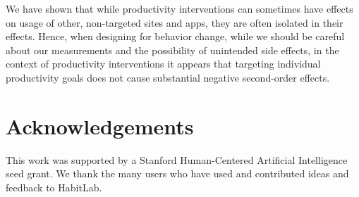 We have shown that while productivity interventions can sometimes have effects on usage of other, non-targeted sites and apps, they are often isolated in their effects. Hence, when designing for behavior change, while we should be careful about our measurements and the possibility of unintended side effects, in the context of productivity interventions it appears that targeting individual productivity goals does not cause substantial negative second-order effects. %



\section{Acknowledgements}

This work was supported by a Stanford Human-Centered Artificial Intelligence seed grant. We thank the many users who have used and contributed ideas and feedback to HabitLab.
